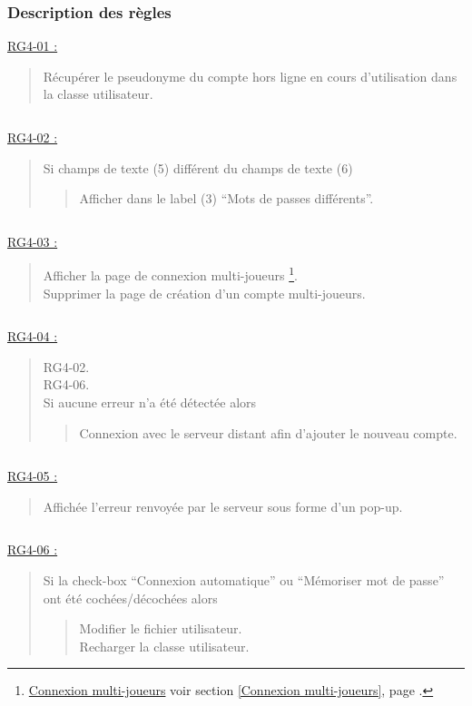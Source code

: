 \documentclass{report}
\begin{document}
		\subsubsection{Description des règles}

			\underline{RG4-01 :}
				\begin{quote}
					Récupérer le pseudonyme du compte hors ligne en cours d'utilisation dans la classe utilisateur.
				\end{quote}

			$\,$

			\underline{RG4-02 :}
				\begin{quote}
					Si champs de texte (5) différent du champs de texte (6)
					\begin{quote}
						Afficher dans le label (3) ``Mots de passes différents''.
					\end{quote}
				\end{quote}

			$\,$				
				
			\underline{RG4-03 :}
				\begin{quote}
					Afficher la page de connexion multi-joueurs%
						\footnote[1]{
							\hyperlink{Connexion multi-joueurs}{Connexion multi-joueurs}
							\og voir section \ref{Connexion multi-joueurs}, page \pageref{Connexion multi-joueurs}.\fg
						}.\\
					Supprimer la page de création d'un compte multi-joueurs.
				\end{quote}
				
			$\,$

			\underline{RG4-04 :}
				\begin{quote}
					RG4-02.\\
					RG4-06.\\
					Si aucune erreur n'a été détectée alors
						\begin{quote}
							Connexion avec le serveur distant afin d'ajouter le nouveau compte.
						\end{quote}
				\end{quote}
				
			$\,$
				
			\underline{RG4-05 :}
				\begin{quote}
					Affichée l'erreur renvoyée par le serveur sous forme d'un pop-up.
				\end{quote}

			$\,$
			
			\underline{RG4-06 :}
				\begin{quote}
					Si la check-box ``Connexion automatique'' ou ``Mémoriser mot de passe'' ont été cochées/décochées alors
					\begin{quote}
						Modifier le fichier utilisateur.\\
						Recharger la classe utilisateur.
					\end{quote}
				\end{quote}			
	
\end{document}
